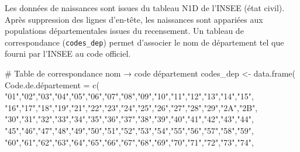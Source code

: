 \documentclass[
  letterpaper,
  DIV=11,
  numbers=noendperiod]{scrartcl}
\newenvironment{Shaded}{\begin{snugshade}}{\end{snugshade}}
\newcommand{\CommentTok}[1]{\textcolor[rgb]{0.37,0.37,0.37}{#1}}
\newcommand{\FunctionTok}[1]{\textcolor[rgb]{0.28,0.35,0.67}{#1}}
\newcommand{\NormalTok}[1]{\textcolor[rgb]{0.00,0.23,0.31}{#1}}
\newcommand{\OtherTok}[1]{\textcolor[rgb]{0.00,0.23,0.31}{#1}}
\newcommand{\StringTok}[1]{\textcolor[rgb]{0.13,0.47,0.30}{#1}}
\begin{document}
Les données de naissances sont issues du tableau N1D de l'INSEE (état
civil). Après suppression des lignes d'en-tête, les naissances sont
appariées aux populations départementales issues du recensement. Un
tableau de correspondance (\texttt{codes\_dep}) permet d'associer le nom
de département tel que fourni par l'INSEE au code officiel.

\begin{Shaded}
\begin{Highlighting}[]
\CommentTok{\# Table de correspondance nom → code département}
\NormalTok{codes\_dep }\OtherTok{\textless{}{-}} \FunctionTok{data.frame}\NormalTok{(}
\NormalTok{  Code.de.département }\OtherTok{=} \FunctionTok{c}\NormalTok{(}
    \StringTok{"01"}\NormalTok{,}\StringTok{"02"}\NormalTok{,}\StringTok{"03"}\NormalTok{,}\StringTok{"04"}\NormalTok{,}\StringTok{"05"}\NormalTok{,}\StringTok{"06"}\NormalTok{,}\StringTok{"07"}\NormalTok{,}\StringTok{"08"}\NormalTok{,}\StringTok{"09"}\NormalTok{,}\StringTok{"10"}\NormalTok{,}\StringTok{"11"}\NormalTok{,}\StringTok{"12"}\NormalTok{,}\StringTok{"13"}\NormalTok{,}\StringTok{"14"}\NormalTok{,}\StringTok{"15"}\NormalTok{,}
    \StringTok{"16"}\NormalTok{,}\StringTok{"17"}\NormalTok{,}\StringTok{"18"}\NormalTok{,}\StringTok{"19"}\NormalTok{,}\StringTok{"21"}\NormalTok{,}\StringTok{"22"}\NormalTok{,}\StringTok{"23"}\NormalTok{,}\StringTok{"24"}\NormalTok{,}\StringTok{"25"}\NormalTok{,}\StringTok{"26"}\NormalTok{,}\StringTok{"27"}\NormalTok{,}\StringTok{"28"}\NormalTok{,}\StringTok{"29"}\NormalTok{,}\StringTok{"2A"}\NormalTok{,}\StringTok{"2B"}\NormalTok{,}
    \StringTok{"30"}\NormalTok{,}\StringTok{"31"}\NormalTok{,}\StringTok{"32"}\NormalTok{,}\StringTok{"33"}\NormalTok{,}\StringTok{"34"}\NormalTok{,}\StringTok{"35"}\NormalTok{,}\StringTok{"36"}\NormalTok{,}\StringTok{"37"}\NormalTok{,}\StringTok{"38"}\NormalTok{,}\StringTok{"39"}\NormalTok{,}\StringTok{"40"}\NormalTok{,}\StringTok{"41"}\NormalTok{,}\StringTok{"42"}\NormalTok{,}\StringTok{"43"}\NormalTok{,}\StringTok{"44"}\NormalTok{,}
    \StringTok{"45"}\NormalTok{,}\StringTok{"46"}\NormalTok{,}\StringTok{"47"}\NormalTok{,}\StringTok{"48"}\NormalTok{,}\StringTok{"49"}\NormalTok{,}\StringTok{"50"}\NormalTok{,}\StringTok{"51"}\NormalTok{,}\StringTok{"52"}\NormalTok{,}\StringTok{"53"}\NormalTok{,}\StringTok{"54"}\NormalTok{,}\StringTok{"55"}\NormalTok{,}\StringTok{"56"}\NormalTok{,}\StringTok{"57"}\NormalTok{,}\StringTok{"58"}\NormalTok{,}\StringTok{"59"}\NormalTok{,}
    \StringTok{"60"}\NormalTok{,}\StringTok{"61"}\NormalTok{,}\StringTok{"62"}\NormalTok{,}\StringTok{"63"}\NormalTok{,}\StringTok{"64"}\NormalTok{,}\StringTok{"65"}\NormalTok{,}\StringTok{"66"}\NormalTok{,}\StringTok{"67"}\NormalTok{,}\StringTok{"68"}\NormalTok{,}\StringTok{"69"}\NormalTok{,}\StringTok{"70"}\NormalTok{,}\StringTok{"71"}\NormalTok{,}\StringTok{"72"}\NormalTok{,}\StringTok{"73"}\NormalTok{,}\StringTok{"74"}\NormalTok{,}

\end{Highlighting}
\end{Shaded}
\end{document}
